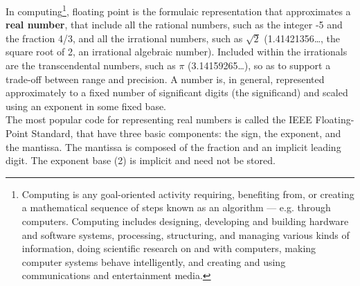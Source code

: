 \documentclass[11pt]{article}
\begin{document}
In computing\footnote{Computing is any goal-oriented activity requiring, benefiting from, or creating a mathematical sequence of steps known as an algorithm — e.g. through computers. Computing includes designing, developing and building hardware and software systems, processing, structuring, and managing various kinds of information, doing scientific research on and with computers, making computer systems behave intelligently, and creating and using communications and entertainment media.}, floating point is the formulaic representation that approximates a \textbf{real number}, that include all the rational numbers, such as the integer -5 and the fraction 4/3, and all the irrational numbers, such as $\sqrt{2}$ (1.41421356…, the square root of 2, an irrational algebraic number). Included within the irrationals are the transcendental numbers, such as $\pi$ (3.14159265…), so as to support a trade-off between range and precision. A number is, in general, represented approximately to a fixed number of significant digits (the significand) and scaled using an exponent in some fixed base.\\

The most popular code for representing real numbers is called the IEEE Floating-Point Standard, that have three basic components: the sign, the exponent, and the mantissa. The mantissa is composed of the fraction and an implicit leading digit. The exponent base (2) is implicit and need not be stored.\\


\end{document}
